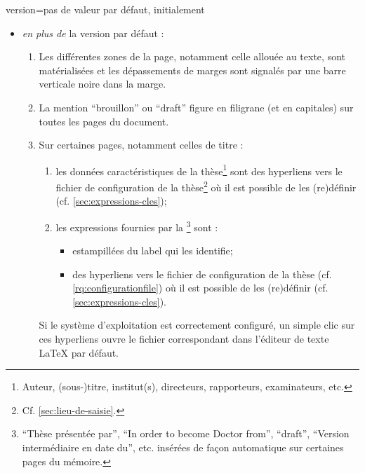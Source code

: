 {\begin{docKey}{version}{=\textbar{}\textbar{}\textbar{}\textbar{}\textbar{}}{pas
      de valeur par défaut, initialement }
\begin{description}
\begin{itemize}
{          intermédiaire en date du } ou \foreignquote{english}{Work
          in progress as of } ne figure pas ;
      \item \emph{en plus de} la version par défaut :
        \begin{enumerate}
        \item Les différentes zones de la page, notamment celle allouée au
          texte, sont matérialisées et les dépassements de marges sont signalés
          par une barre verticale noire dans la marge.
        \item La mention \enquote{brouillon} ou
          \foreignquote{english}{draft}\selonlangue{} figure en filigrane (et
          en capitales) sur toutes les pages du document.
        \item Sur certaines pages, notamment celles de titre :
          \begin{enumerate}
          \item les données caractéristiques de la thèse\footnote{Auteur,
              (sous-)titre, institut(s), directeurs, rapporteurs, examinateurs,
              etc.} sont des hyperliens vers le fichier de configuration de la
            thèse\footnote{Cf. \vref{sec:lieu-de-saisie}.} où il est possible
            de les (re)définir (cf. \vref{sec:expressions-cles});
          \item\label{item-expression} les expressions fournies par la
            \yatcl\footnote{\enquote{Thèse présentée par},
              \foreignquote{english}{In order to become Doctor from},
              \foreignquote{english}{draft}, \enquote{Version intermédiaire en
                date du}, etc. insérées de façon automatique sur certaines
              pages du mémoire.} sont :
            \begin{itemize}
            \item estampillées du label qui les identifie;
            \item des hyperliens vers le fichier de configuration de la thèse
              (cf.  \vref{rq:configurationfile}) où il est possible de les
              (re)définir (cf. \vref{sec:expressions-cles}).
            \end{itemize}
          \end{enumerate}
          Si le système d'exploitation est correctement configuré, un simple
          clic sur ces hyperliens ouvre le fichier correspondant dans l'éditeur
          de texte \LaTeX{} par défaut.
        \end{enumerate}
      \end{itemize}
    \end{description}
  \end{docKey}
}

